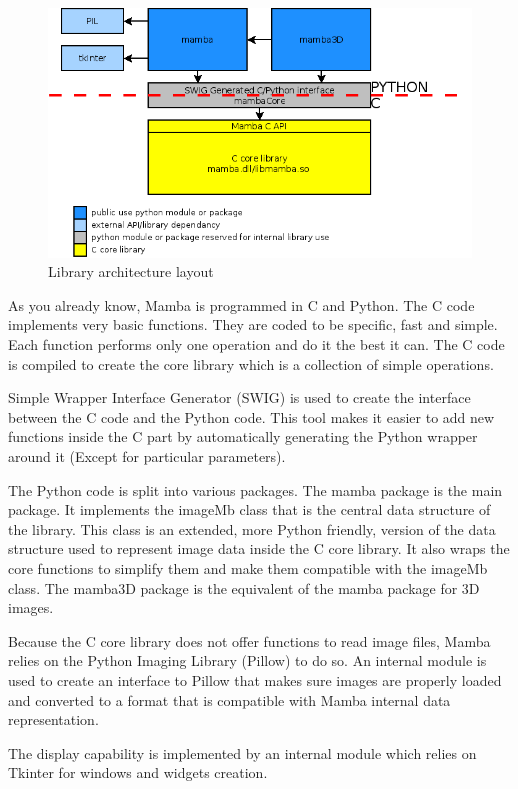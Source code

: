 \documentclass[a4paper,10pt,oneside]{article}
\begin{document}
\begin{figure}
\centering
\includegraphics[scale=0.5]{figures/archi.png}
\caption{Library architecture layout}
\label{fig:archi_lay}
\end{figure}

As you already know, Mamba is programmed in C and Python. The C code implements
very basic functions. They are coded to be specific, fast and simple. Each 
function performs only one operation and do it the best it can. The C code is 
compiled to create the core library which is a collection of simple operations.

Simple Wrapper Interface Generator (SWIG) is used to create the interface 
between the C code and the Python code. This tool makes it easier to add new
functions inside the C part by automatically generating the Python wrapper
around it (Except for particular parameters).

The Python code is split into various packages. The mamba package is the 
main package. It implements the imageMb class that is the
central data structure of the library. This class is an extended, more Python
friendly, version of the data structure used to represent image data inside the
C core library. It also wraps the core functions to simplify them
and make them compatible with the imageMb class. The mamba3D package is the
equivalent of the mamba package for 3D images.

Because the C core library does not offer functions to read image files, Mamba
relies on the Python Imaging Library (Pillow) to do so. An internal module is used
to create an interface to Pillow that makes sure images are properly loaded and
converted to a format that is compatible with Mamba internal data representation.

The display capability is implemented by an internal module which relies on
Tkinter for windows and widgets creation.
\end{document}
